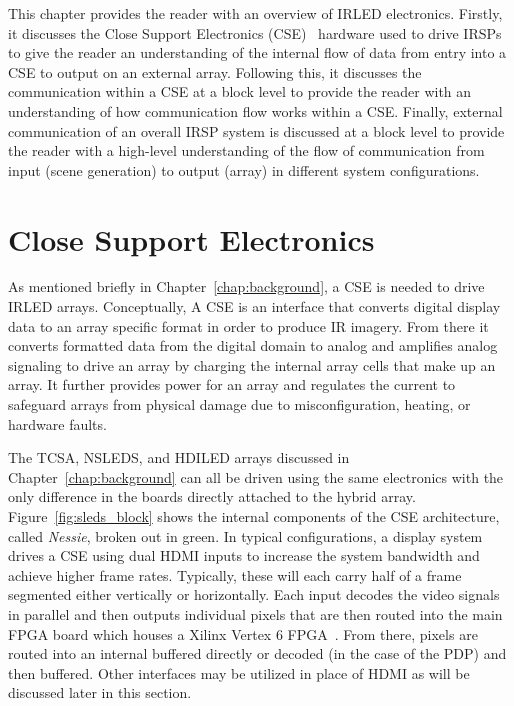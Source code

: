 \label{chap:system_overview}
This chapter provides the reader with an overview of IRLED electronics. Firstly, it discusses the Close Support Electronics (CSE)~\cite{EjzakEtAl2015,HernandezEtAl2019,SinghEtAl2020} hardware used to drive IRSPs to give the reader an understanding of the internal flow of data from entry into a CSE to output on an external array. Following this, it discusses the communication within a CSE at a block level to provide the reader with an understanding of how communication flow works within a CSE. Finally, external communication of an overall IRSP system is discussed at a block level to provide the reader with a high-level understanding of the flow of communication from input (scene generation) to output (array) in different system configurations.

\section{Close Support Electronics}
    \label{sec:close_support_electronics}
    As mentioned briefly in Chapter~\ref{chap:background}, a CSE is needed to drive IRLED arrays. Conceptually, A CSE is an interface that converts digital display data to an array specific format in order to produce IR imagery. From there it converts formatted data from the digital domain to analog and amplifies analog signaling to drive an array by charging the internal array cells that make up an array. It further provides power for an array and regulates the current to safeguard arrays from physical damage due to misconfiguration, heating, or hardware faults.

    The TCSA, NSLEDS, and HDILED arrays discussed in Chapter~\ref{chap:background} can all be driven using the same electronics with the only difference in the boards directly attached to the hybrid array. Figure~\ref{fig:sleds_block} shows the internal components of the CSE architecture, called {\it Nessie}, broken out in green. In typical configurations, a display system drives a CSE using dual HDMI inputs to increase the system bandwidth and achieve higher frame rates. Typically, these will each carry half of a frame segmented either vertically or horizontally. Each input decodes the video signals in parallel and then outputs individual pixels that are then routed into the main FPGA board which houses a Xilinx Vertex 6 FPGA~\cite{XILINX2015}. From there, pixels are routed into an internal buffered directly or decoded (in the case of the PDP) and then buffered. Other interfaces may be utilized in place of HDMI as will be discussed later in this section.


